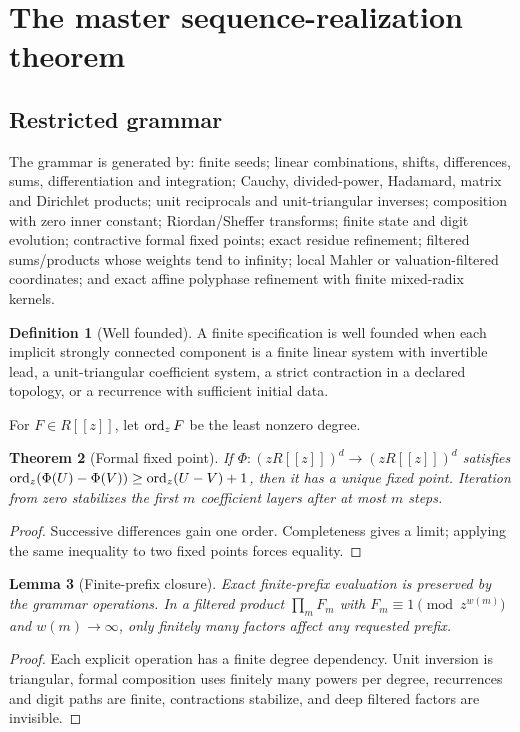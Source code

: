 \documentclass[11pt]{article}
\newtheorem{theorem}{Theorem}[section]\newtheorem{proposition}[theorem]{Proposition}\newtheorem{lemma}[theorem]{Lemma}\newtheorem{corollary}[theorem]{Corollary}
\theoremstyle{definition}\newtheorem{definition}[theorem]{Definition}\newtheorem{example}[theorem]{Example}\newtheorem{construction}[theorem]{Construction}\newtheorem{algorithm}[theorem]{Algorithm}\newtheorem{conjecture}[theorem]{Conjecture}\newtheorem{problem}[theorem]{Problem}
\theoremstyle{remark}\newtheorem{remark}[theorem]{Remark}\newtheorem{boundary}[theorem]{Boundary}\newtheorem{certificate}[theorem]{Computational Certificate}\newtheorem{classical}[theorem]{Classical Input}\newtheorem{principle}[theorem]{Structural Principle}
\begin{document}

\section{The master sequence-realization theorem}
\subsection{Restricted grammar}
The grammar is generated by: finite seeds; linear combinations, shifts, differences, sums, differentiation and integration; Cauchy, divided-power, Hadamard, matrix and Dirichlet products; unit reciprocals and unit-triangular inverses; composition with zero inner constant; Riordan/Sheffer transforms; finite state and digit evolution; contractive formal fixed points; exact residue refinement; filtered sums/products whose weights tend to infinity; local Mahler or valuation-filtered coordinates; and exact affine polyphase refinement with finite mixed-radix kernels.
\begin{definition}[Well founded]
A finite specification is well founded when each implicit strongly connected component is a finite linear system with invertible lead, a unit-triangular coefficient system, a strict contraction in a declared topology, or a recurrence with sufficient initial data.
\end{definition}
For $F\in R[[z]]$, let $\operatorname{ord}_zF$ be the least nonzero degree.
\begin{theorem}[Formal fixed point]
If $\Phi:(zR[[z]])^d\to(zR[[z]])^d$ satisfies $\operatorname{ord}_z(\Phi(U)-\Phi(V))\ge\operatorname{ord}_z(U-V)+1$, then it has a unique fixed point. Iteration from zero stabilizes the first $m$ coefficient layers after at most $m$ steps.
\end{theorem}
\begin{proof}Successive differences gain one order. Completeness gives a limit; applying the same inequality to two fixed points forces equality.\end{proof}
\begin{lemma}[Finite-prefix closure]
Exact finite-prefix evaluation is preserved by the grammar operations. In a filtered product $\prod_mF_m$ with $F_m\equiv1\pmod{z^{w(m)}}$ and $w(m)\to\infty$, only finitely many factors affect any requested prefix.
\end{lemma}
\begin{proof}Each explicit operation has a finite degree dependency. Unit inversion is triangular, formal composition uses finitely many powers per degree, recurrences and digit paths are finite, contractions stabilize, and deep filtered factors are invisible.\end{proof}
\end{document}
